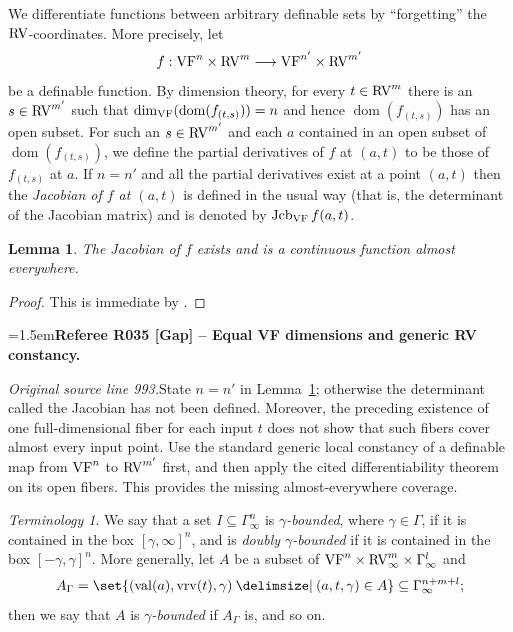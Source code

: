 \documentclass[12pt]{amsart}
\newcommand{\RefereeRemark}[4]{%
  \par\medskip\begingroup\normalfont\small\color{RefereePurple}%
  \emergencystretch=1.5em\noindent\textbf{Referee R#1 [#2] -- #3.}\par\nobreak\noindent #4\par
  \endgroup\medskip
}
\newcommand{\memph}[1]{{\color{magenta}\emph{#1}}}
\theoremstyle{plain}
\newtheorem{lem}[thm]{Lemma}
\theoremstyle{definition}
\theoremstyle{remark}
\newtheorem{ter}[thm]{Terminology}
\numberwithin{equation}{section}
\theoremstyle{plain}
\newcommand{\VF}{\textup{VF}}
\newcommand{\RV}{\textup{RV}}
\DeclareMathOperator{\dom}{dom}
\DeclareMathOperator{\jcb}{Jcb}
\newcommand{\0}{\emptyset}
\newcommand{\fun}{\longrightarrow}
\newcommand{\sub}{\subseteq}
\providecommand\given{}
\newcommand\SetSymbol[1][]{%
\nonscript \: #1 \vert
\allowbreak
\nonscript\:
\mathopen{}}
\renewcommand\given{\SetSymbol[\delimsize]}
\DeclareMathOperator{\vv}{val}
\DeclareMathOperator{\vrv}{vrv}
\begin{document}
We differentiate functions between arbitrary definable sets by ``forgetting'' the $\RV$-coordinates. More precisely, let
\[
f : \VF^n \times \RV^m \fun \VF^{n'} \times \RV^{m'}
\]
be a definable function. By dimension theory, for every $t \in \RV^m$ there is an $s \in \RV^{m'}$ such that $\dim_{\VF}(\dom(f_{(t, s)})) = n$ and hence $\dom(f_{(t, s)})$ has an open subset. For such an $s \in \RV^{m'}$ and each $a$ contained in an open subset of $\dom(f_{(t, s)})$, we define the partial derivatives of $f$ at $(a, t)$ to be those of $f_{(t, s)}$ at $a$. If $n = n'$ and all the partial derivatives exist at a point $(a, t)$ then the \memph{Jacobian of $f$ at $(a,t)$} is defined in the usual way (that is, the determinant of the Jacobian matrix) and is denoted by $\jcb_{\VF} f(a,t)$.

\begin{lem}\label{diff:almost:every}
The Jacobian of $f$  exists and is a continuous function almost everywhere.
\end{lem}
\begin{proof}
This is immediate by \cite[Corollary~9.9]{Yin:special:trans}.
\end{proof}

\RefereeRemark{035}{Gap}{Equal VF dimensions and generic RV constancy}{%
\textit{Original source line 993.}\quad State $n=n'$ in Lemma~\ref{diff:almost:every}; otherwise the determinant called the Jacobian has not been defined. Moreover, the preceding existence of one full-dimensional fiber for each input $t$ does not show that such fibers cover almost every input point. Use the standard generic local constancy of a definable map from $\VF^n$ to $\RV^{m'}$ first, and then apply the cited differentiability theorem on its open fibers. This provides the missing almost-everywhere coverage.
}

\begin{ter}\label{bounded}
We say that a set $I \sub \Gamma_{\infty}^n$ is \memph{$\gamma$-bounded}, where $\gamma \in \Gamma$, if it is contained in the box $[\gamma, \infty]^n$, and is \memph{doubly $\gamma$-bounded} if it is contained in the box $[-\gamma, \gamma]^n$. More generally, let $A$ be a subset of $\VF^n \times \RV_\infty^m \times \Gamma_\infty^l$ and
\[
A_{\Gamma} = \set{(\vv(a), \vrv(t), \gamma) \given (a, t, \gamma) \in A} \sub \Gamma_{\infty}^{n+m+l};
\]
then we say that $A$ is \memph{$\gamma$-bounded} if $A_{\Gamma}$ is, and so on.
\end{ter}
\end{document}
